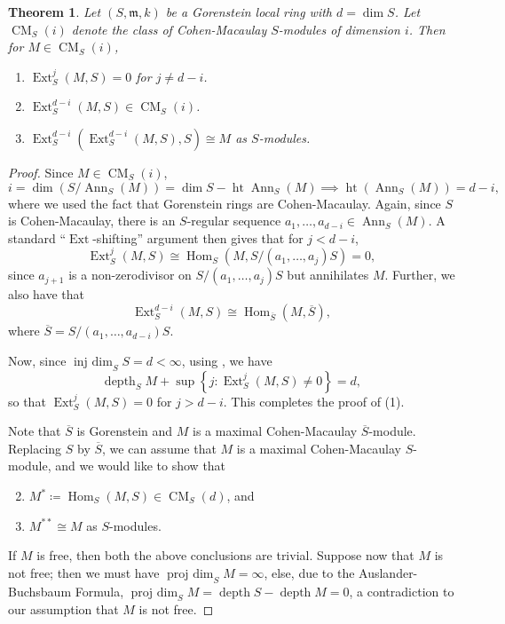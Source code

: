 \documentclass[10pt]{article}
\theoremstyle{thmstyle}
\newtheorem{theorem}{Theorem}[section]
\theoremstyle{defstyle}
\newcommand{\Ann}{\operatorname{Ann}}
\newcommand{\Hom}{\operatorname{Hom}}
\newcommand{\frakm}{\mathfrak{m}} %
\newcommand{\Ext}{\operatorname{Ext}}
\newcommand{\projdim}{\operatorname{proj~dim}}
\newcommand{\injdim}{\operatorname{inj~dim}}
\newcommand{\hght}{\operatorname{ht}}
\newcommand{\depth}{\operatorname{depth}}
\newcommand{\CM}{\operatorname{CM}}
\begin{document}
\begin{theorem}
    Let $(S,\frakm, k)$ be a Gorenstein local ring with $d = \dim S$. Let $\CM_S(i)$ denote the class of Cohen-Macaulay $S$-modules of dimension $i$. Then for $M\in \CM_S(i)$, 
    \begin{enumerate}[label=(\arabic*)]
        \item $\Ext^j_S(M, S) = 0$ for $j\ne d - i$. 
        \item $\Ext^{d - i}_S(M, S)\in\CM_S(i)$. 
        \item $\Ext^{d - i}_S\left(\Ext^{d - i}_S(M, S), S\right)\cong M$ as $S$-modules.
    \end{enumerate}
\end{theorem}
\begin{proof}
    Since $M\in\CM_S(i)$, 
    \begin{equation*}
        i = \dim\left(S/\Ann_S(M)\right) = \dim S - \hght\Ann_S(M)\implies \hght(\Ann_S(M)) = d - i,
    \end{equation*}
    where we used the fact that Gorenstein rings are Cohen-Macaulay. Again, since $S$ is Cohen-Macaulay, there is an $S$-regular sequence $a_1,\dots, a_{d - i}\in\Ann_S(M)$. A standard ``$\Ext$-shifting'' argument then gives that for $j < d - i$, 
    \begin{equation*}
        \Ext^j_S(M, S)\cong\Hom_S\left(M, S/(a_1,\dots, a_j)S\right) = 0,
    \end{equation*}
    since $a_{j + 1}$ is a non-zerodivisor on $S/(a_1,\dots,a_j)S$ but annihilates $M$. Further, we also have that 
    \begin{equation*}
        \Ext^{d - i}_S(M, S)\cong\Hom_{\overline S}(M, \overline S),
    \end{equation*}
    where $\overline S = S/(a_1,\dots,a_{d - i})S$.

    Now, since $\injdim_S S = d < \infty$, using , we have 
    \begin{equation*}
        \depth_S M + \sup\left\{j\colon\Ext^j_S(M, S)\ne 0\right\} = d,
    \end{equation*}
    so that $\Ext^j_S(M, S) = 0$ for $j > d - i$. This completes the proof of (1).

    Note that $\overline S$ is Gorenstein and $M$ is a maximal Cohen-Macaulay $\overline S$-module. Replacing $S$ by $\overline S$, we can assume that $M$ is a maximal Cohen-Macaulay $S$-module, and we would like to show that 
    \begin{enumerate}[label=(\arabic*)]
        \setcounter{enumi}{1}
        \item $M^\ast \coloneq\Hom_S(M, S)\in\CM_S(d)$, and 
        \item $M^{\ast\ast}\cong M$ as $S$-modules.
    \end{enumerate}
    If $M$ is free, then both the above conclusions are trivial. Suppose now that $M$ is not free; then we must have $\projdim_S M = \infty$, else, due to the Auslander-Buchsbaum Formula, $\projdim_S M = \depth S - \depth M = 0$, a contradiction to our assumption that $M$ is not free.


\end{proof}
\end{document}
